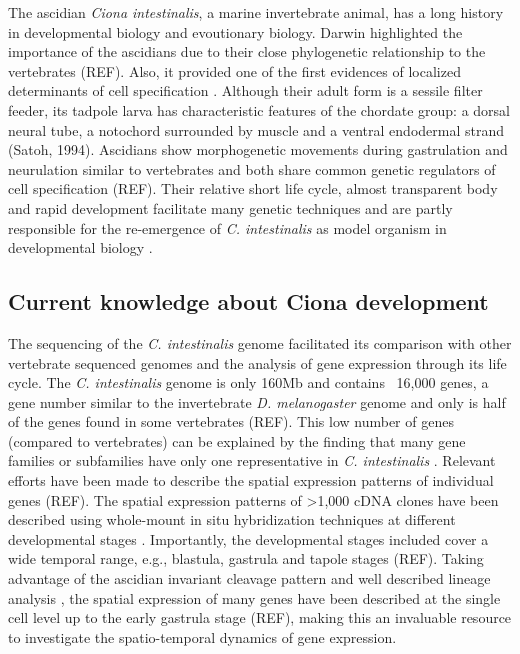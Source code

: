 
	The ascidian \textit{Ciona intestinalis}, a marine invertebrate animal, has a long history in developmental biology and evoutionary biology. 
	Darwin highlighted the importance of the ascidians due to their  close phylogenetic relationship to the vertebrates (REF). 
	Also, it provided one of the first evidences of localized determinants of cell specification \citep{Conklin1905}. 
	Although their adult form is a sessile filter feeder, its tadpole larva has characteristic features of the chordate group: a dorsal neural tube, a notochord surrounded by muscle and a ventral endodermal strand (Satoh, 1994).
	Ascidians show morphogenetic movements during gastrulation and neurulation similar to vertebrates and both share common genetic regulators of cell specification (REF).
	Their relative short life cycle, almost transparent body and rapid development facilitate many genetic techniques and are partly responsible for the re-emergence of \textit{C. intestinalis} as model organism in developmental biology \citep{Levin2012}.
	
\subsection{Current knowledge about Ciona development}
	The sequencing of the \textit{C. intestinalis} genome \citep{Dehal2002} facilitated its comparison with other vertebrate sequenced genomes and the analysis of gene expression through its life cycle.
	The \textit{C. intestinalis} genome is only 160Mb and contains ~16,000 genes, a gene number similar to the invertebrate \textit{D. melanogaster} genome and only is half of the genes found in some vertebrates (REF).
	This low number of genes (compared to vertebrates) can be explained by the finding that many gene families or subfamilies have only one representative in \textit{C. intestinalis} \citep{Dehal2002}.
	Relevant efforts have been made to describe the spatial expression patterns of individual genes (REF).
	The spatial expression patterns of  >1,000 cDNA clones have been described using whole-mount in situ hybridization techniques at different developmental stages \citep{Imai2004}.
	 Importantly, the developmental stages included cover a wide temporal range, e.g., blastula, gastrula and tapole stages (REF).
	 Taking advantage of the ascidian invariant cleavage pattern and well described lineage analysis \citep{Conklin1905,Nishida1987}, the spatial expression of many genes have been described at the single cell level up to the early gastrula stage (REF), making this an invaluable resource to investigate the spatio-temporal dynamics of gene expression.

